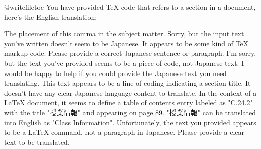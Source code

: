 \relax
\providecommand\hyper@newdestlabel[2]{}
@writefile{toc}{\protected@file@percent }
You have provided TeX code that refers to a section in a document, here's the English translation:


The placement of this comma in the subject matter.
Sorry, but the input text you've written doesn't seem to be Japanese. It appears to be some kind of TeX markup code. Please provide a correct Japanese sentence or paragraph.
I'm sorry, but the text you've provided seems to be a piece of code, not Japanese text. I would be happy to help if you could provide the Japanese text you need translating.
This text appears to be a line of coding indicating a section title. It doesn't have any clear Japanese language content to translate. In the context of a LaTeX document, it seems to define a table of contents entry labeled as "C.24.2" with the title "授業情報" and appearing on page 89. "授業情報" can be translated into English as "Class Information".
Unfortunately, the text you provided appears to be a LaTeX command, not a paragraph in Japanese. Please provide a clear text to be translated.
